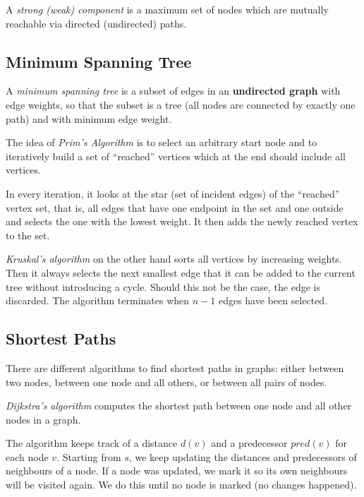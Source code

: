 \documentclass[english]{panikzettel}
\begin{document}
A \emph{strong (weak) component} is a maximum set of nodes which are mutually reachable via directed (undirected) paths.

\begin{halfboxl}
    \vspace{-15pt}

    \subsection{Minimum Spanning Tree}

    A \emph{minimum spanning tree} is a subset of edges in an \textbf{undirected graph} with edge weights, so that the subset is a tree (all nodes are connected by exactly one path) and with minimum edge weight.

    The idea of \emph{Prim's Algorithm} is to select an arbitrary start node and to iteratively build a set of ``reached'' vertices which at the end should include all vertices.

    In every iteration, it looks at the star (set of incident edges) of the ``reached'' vertex set, that is, all edges that have one endpoint in the set and one outside and selects the one with the lowest weight.
    It then adds the newly reached vertex to the set.

    \emph{Kruskal's algorithm} on the other hand sorts all vertices by increasing weights.
    Then it always selects the next smallest edge that it can be added to the current tree without introducing a cycle.
    Should this not be the case, the edge is discarded.
    The algorithm terminates when $n-1$ edges have been selected.

    \subsection{Shortest Paths}

    There are different algorithms to find shortest paths in graphs: either between two nodes, between one node and all others, or between all pairs of nodes.

    \emph{Dijkstra's algorithm} computes the shortest path between one node and all other nodes in a graph.

    The algorithm keeps track of a distance $d(v)$ and a predecessor $pred(v)$ for each node $v$.
    Starting from $s$, we keep updating the distances and predecessors of neighbours of a node.
    If a node was updated, we mark it so its own neighbours will be visited again.
    We do this until no node is marked (no changes happened).
\end{halfboxl}%
\end{document}
